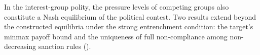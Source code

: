  In the interest-group polity, the pressure levels of competing
groups also constitute a Nash equilibrium of the political contest. Two results extend
beyond the constructed equilibria under the strong entrenchment condition: the target's
minmax payoff bound and the uniqueness of full non-compliance among non-decreasing
sanction rules ().

